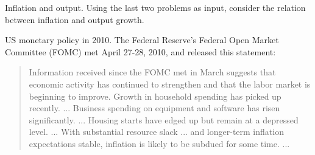 \documentclass[12pt]{exam}
\begin{document}
\begin{questions}
\begin{solution}
\end{solution}


\question Inflation and output.
Using the last two problems as input, consider the relation
between inflation and output growth.

\begin{solution}
\end{solution}

\question US monetary policy in 2010.
The Federal Reserve's Federal Open Market Committee (FOMC)
met April 27-28, 2010, and released this statement:
%
\begin{quote}
Information received since the FOMC met in March suggests that economic activity has continued to strengthen and that the labor market is beginning to improve. Growth in household spending has picked up recently.  ...
Business spending on equipment and software has risen significantly. ...
Housing starts have edged up but remain at a depressed level. ...
With substantial resource slack ... and longer-term inflation expectations stable, inflation is likely to be subdued for some time. ...


\end{quote}
\end{questions}
\end{document}
